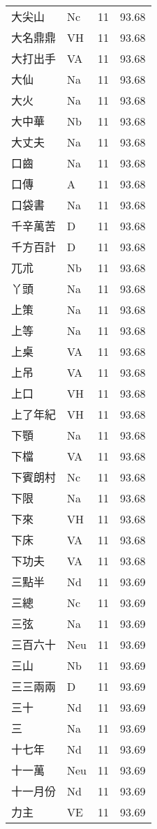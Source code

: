 \documentclass[twocolumn]{book}
\begin{document}
\begin{supertabular}{llrr}
大尖山 & Nc & 11 &  93.68\\
大名鼎鼎 & VH & 11 &  93.68\\
大打出手 & VA & 11 &  93.68\\
大仙 & Na & 11 &  93.68\\
大火 & Na & 11 &  93.68\\
大中華 & Nb & 11 &  93.68\\
大丈夫 & Na & 11 &  93.68\\
口齒 & Na & 11 &  93.68\\
口傳 & A & 11 &  93.68\\
口袋書 & Na & 11 &  93.68\\
千辛萬苦 & D & 11 &  93.68\\
千方百計 & D & 11 &  93.68\\
兀朮 & Nb & 11 &  93.68\\
丫頭 & Na & 11 &  93.68\\
上策 & Na & 11 &  93.68\\
上等 & Na & 11 &  93.68\\
上桌 & VA & 11 &  93.68\\
上吊 & VA & 11 &  93.68\\
上口 & VH & 11 &  93.68\\
上了年紀 & VH & 11 &  93.68\\
下顎 & Na & 11 &  93.68\\
下檔 & VA & 11 &  93.68\\
下賓朗村 & Nc & 11 &  93.68\\
下限 & Na & 11 &  93.68\\
下來 & VH & 11 &  93.68\\
下床 & VA & 11 &  93.68\\
下功夫 & VA & 11 &  93.68\\
三點半 & Nd & 11 &  93.69\\
三總 & Nc & 11 &  93.69\\
三弦 & Na & 11 &  93.69\\
三百六十 & Neu & 11 &  93.69\\
三山 & Nb & 11 &  93.69\\
三三兩兩 & D & 11 &  93.69\\
三十 & Nd & 11 &  93.69\\
三 & Na & 11 &  93.69\\
十七年 & Nd & 11 &  93.69\\
十一萬 & Neu & 11 &  93.69\\
十一月份 & Nd & 11 &  93.69\\
力主 & VE & 11 &  93.69\\

\end{supertabular}
\end{document}
